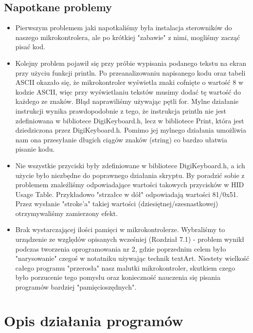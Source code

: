 \documentclass{article}
\begin{document}
\subsection{Napotkane problemy}
\begin{itemize}
    \item Pierwszym problemem jaki napotkaliśmy była instalacja sterowników do naszego mikrokontrolera, ale po krótkiej "zabawie" z nimi, mogliśmy zacząć pisać kod. 
    \item Kolejny problem pojawił się przy próbie wypisania podanego tekstu na ekran przy użyciu funkcji println. Po przeanalizowaniu napisanego kodu oraz tabeli ASCII okazało się, że mikrokontroler wyświetla znaki cofnięte o wartość 8 w kodzie ASCII, więc przy wyświetlaniu tekstów musimy dodać tę wartość do każdego ze znaków. Błąd naprawiliśmy używając pętli for. Mylne działanie instrukcji wynika prawdopodobnie z tego, że instrukcja println nie jest zdefiniowana w bibliotece DigiKeyboard.h, lecz w bibliotece Print, która jest dziedziczona przez DigiKeyboard.h. Pomimo jej mylnego działania umożliwia nam ona przesyłanie długich ciągów znaków (string) co bardzo ułatwia pisanie kodu.
    \item Nie wszystkie przyciski były zdefiniowane w bibliotece DigiKeyboard.h, a ich użycie było niezbędne do poprawnego działania skryptu. By poradzić sobie z problemem znaleźliśmy odpowiadające wartości takowych przycisków w HID Usage Table. Przykładowo "strzałce w dół" odpowiadają wartości 81/0x51. Przez wysłanie "stroke'a" takiej wartości (dziesiętnej/szesnastkowej) otrzymywaliśmy zamierzony efekt.
    \item Brak wystarczającej ilości pamięci w mikrokontrolerze. Wybraliśmy to urządzenie ze względów opisanych wcześniej (Rozdział 7.1) - problem wynikł podczas tworzenia oprogramowania nr 2, gdzie poprzednim celem było "narysowanie" czegoś w notatniku używając technik textArt. Niestety wielkość całego programu "przerosła" nasz malutki mikrokontroler, skutkiem czego było porzucenie tego pomysłu oraz konieczność nauczenia się pisania programów bardziej "pamięcioszędnych".
\end{itemize}




\section{Opis działania programów}
\end{document}
